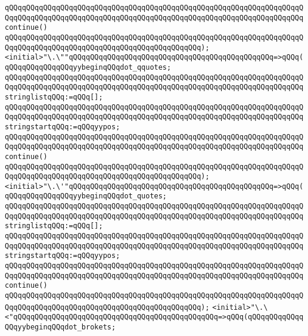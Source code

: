 \verb|qQQqqQQqqQQqqQQqqQQqqQQqqQQqqQQqqQQqqQQqqQQqqQQqqQQqqQQqqQQqqQQqqQQqqQQqqQQqqQQqqQQqqQQqqQQqqQQqqQQqqQQqqQQqqQQqqQQqqQQqqQQqqQQqqQQqqQQqqQQqcontinue()|\newline
\verb|qQQqqQQqqQQqqQQqqQQqqQQqqQQqqQQqqQQqqQQqqQQqqQQqqQQqqQQqqQQqqQQqqQQqqQQqqQQqqQQqqQQqqQQqqQQqqQQqqQQqqQQqqQQqqQQqqQQq);|\newline
\newline
\verb|<initial>"\.\""qQQqqQQqqQQqqQQqqQQqqQQqqQQqqQQqqQQqqQQqqQQqqQQq=>qQQq(qQQqqQQqqQQqqQQqyybeginqQQqdot_qquotes;|\newline
\verb|qQQqqQQqqQQqqQQqqQQqqQQqqQQqqQQqqQQqqQQqqQQqqQQqqQQqqQQqqQQqqQQqqQQqqQQqqQQqqQQqqQQqqQQqqQQqqQQqqQQqqQQqqQQqqQQqqQQqqQQqqQQqqQQqqQQqqQQqqQQqstringlistqQQq:=qQQq[];|\newline
\verb|qQQqqQQqqQQqqQQqqQQqqQQqqQQqqQQqqQQqqQQqqQQqqQQqqQQqqQQqqQQqqQQqqQQqqQQqqQQqqQQqqQQqqQQqqQQqqQQqqQQqqQQqqQQqqQQqqQQqqQQqqQQqqQQqqQQqqQQqqQQqstringstartqQQq:=qQQqyypos;|\newline
\verb|qQQqqQQqqQQqqQQqqQQqqQQqqQQqqQQqqQQqqQQqqQQqqQQqqQQqqQQqqQQqqQQqqQQqqQQqqQQqqQQqqQQqqQQqqQQqqQQqqQQqqQQqqQQqqQQqqQQqqQQqqQQqqQQqqQQqqQQqqQQqcontinue()|\newline
\verb|qQQqqQQqqQQqqQQqqQQqqQQqqQQqqQQqqQQqqQQqqQQqqQQqqQQqqQQqqQQqqQQqqQQqqQQqqQQqqQQqqQQqqQQqqQQqqQQqqQQqqQQqqQQqqQQqqQQq);|\newline
\newline
\verb|<initial>"\.\'"qQQqqQQqqQQqqQQqqQQqqQQqqQQqqQQqqQQqqQQqqQQqqQQq=>qQQq(qQQqqQQqqQQqqQQqyybeginqQQqdot_quotes;|\newline
\verb|qQQqqQQqqQQqqQQqqQQqqQQqqQQqqQQqqQQqqQQqqQQqqQQqqQQqqQQqqQQqqQQqqQQqqQQqqQQqqQQqqQQqqQQqqQQqqQQqqQQqqQQqqQQqqQQqqQQqqQQqqQQqqQQqqQQqqQQqqQQqstringlistqQQq:=qQQq[];|\newline
\verb|qQQqqQQqqQQqqQQqqQQqqQQqqQQqqQQqqQQqqQQqqQQqqQQqqQQqqQQqqQQqqQQqqQQqqQQqqQQqqQQqqQQqqQQqqQQqqQQqqQQqqQQqqQQqqQQqqQQqqQQqqQQqqQQqqQQqqQQqqQQqstringstartqQQq:=qQQqyypos;|\newline
\verb|qQQqqQQqqQQqqQQqqQQqqQQqqQQqqQQqqQQqqQQqqQQqqQQqqQQqqQQqqQQqqQQqqQQqqQQqqQQqqQQqqQQqqQQqqQQqqQQqqQQqqQQqqQQqqQQqqQQqqQQqqQQqqQQqqQQqqQQqqQQqcontinue()|\newline
\verb|qQQqqQQqqQQqqQQqqQQqqQQqqQQqqQQqqQQqqQQqqQQqqQQqqQQqqQQqqQQqqQQqqQQqqQQqqQQqqQQqqQQqqQQqqQQqqQQqqQQqqQQqqQQqqQQqqQQq);|\newline
\newline
\verb|<initial>"\.\<"qQQqqQQqqQQqqQQqqQQqqQQqqQQqqQQqqQQqqQQqqQQqqQQq=>qQQq(qQQqqQQqqQQqqQQqyybeginqQQqdot_brokets;|\newline
